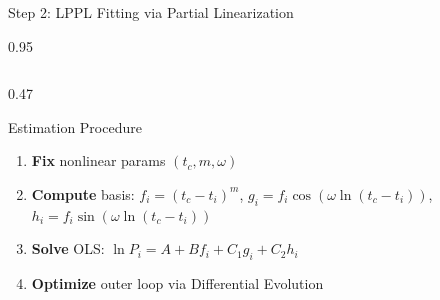 \documentclass[9pt, aspectratio=169, t]{beamer}
\begin{document}
\begin{frame}{Step 2: LPPL Fitting via Partial Linearization}
    \begin{cminipage}{0.95\textwidth}
    {\scriptsize
    \begin{columns}[T]
        \begin{column}{0.47\textwidth}
            \begin{block}{Estimation Procedure}
                \begin{enumerate}\setlength{\itemsep}{1pt}
                    \item \textbf{Fix} nonlinear params $(t_c, m, \omega)$
                    \item \textbf{Compute} basis: $f_i = (t_c - t_i)^m$, $g_i = f_i\cos(\omega\ln(t_c - t_i))$, $h_i = f_i\sin(\omega\ln(t_c - t_i))$
                    \item \textbf{Solve} OLS: $\ln P_i = A + Bf_i + C_1 g_i + C_2 h_i$
                    \item \textbf{Optimize} outer loop via Differential Evolution
                \end{enumerate}
            \end{block}


\end{column}
\end{columns}}
\end{cminipage}
\end{frame}
\end{document}
